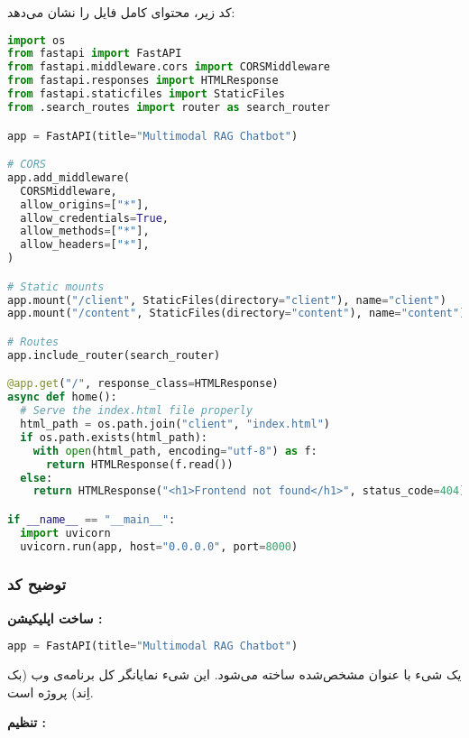 \documentclass{article}
\begin{document}
کد زیر، محتوای کامل فایل  را نشان می‌دهد:

\begin{latin}
\begin{lstlisting}[language=Python]
import os
from fastapi import FastAPI
from fastapi.middleware.cors import CORSMiddleware
from fastapi.responses import HTMLResponse
from fastapi.staticfiles import StaticFiles
from .search_routes import router as search_router

app = FastAPI(title="Multimodal RAG Chatbot")

# CORS
app.add_middleware(
  CORSMiddleware,
  allow_origins=["*"],
  allow_credentials=True,
  allow_methods=["*"],
  allow_headers=["*"],
)

# Static mounts
app.mount("/client", StaticFiles(directory="client"), name="client")
app.mount("/content", StaticFiles(directory="content"), name="content")

# Routes
app.include_router(search_router)

@app.get("/", response_class=HTMLResponse)
async def home():
  # Serve the index.html file properly
  html_path = os.path.join("client", "index.html")
  if os.path.exists(html_path):
    with open(html_path, encoding="utf-8") as f:
      return HTMLResponse(f.read())
  else:
    return HTMLResponse("<h1>Frontend not found</h1>", status_code=404)

if __name__ == "__main__":
  import uvicorn
  uvicorn.run(app, host="0.0.0.0", port=8000)
\end{lstlisting}
\end{latin}

\subsubsection{توضیح کد}

\textbf{ساخت اپلیکیشن :}

\begin{latin}
\begin{lstlisting}[language=Python]
app = FastAPI(title="Multimodal RAG Chatbot")
\end{lstlisting}
\end{latin}
یک شیء  با عنوان مشخص‌شده ساخته می‌شود. این شیء نمایانگر کل برنامه‌ی وب (بک اِند) پروژه است.

\textbf{تنظیم :}
\end{document}
